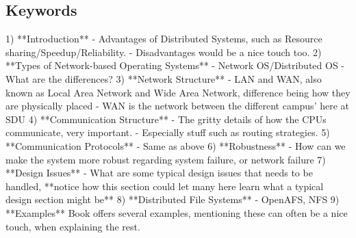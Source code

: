 \documentclass[a4paper,10pt,titlepage]{report}
\begin{document}
\subsection{Keywords}
1) **Introduction** 
	- Advantages of Distributed Systems, such as Resource sharing/Speedup/Reliability. 
	- Disadvantages would be a nice touch too.
2) **Types of Network-based Operating Systems** 
	- Network OS/Distributed OS
	- What are the differences?
3) **Network Structure** 
	- LAN and WAN, also known as Local Area Network and Wide Area Network, difference being how they are physically placed 
	- WAN is the network between the different campus' here at SDU
4) **Communication Structure** 
	- The gritty details of how the CPUs communicate, very important. 
	- Especially stuff such as routing strategies.
5) **Communication Protocols** 
	- Same as above
6) **Robustness** 
	- How can we make the system more robust regarding system failure, or network failure
7) **Design Issues** 
	- What are some typical design issues that needs to be handled, 
	**notice how this section could let many here learn what a typical design section might be**
8) **Distributed File Systems** 
	- OpenAFS, NFS
9) **Examples** 
	Book offers several examples, mentioning these can often be a nice touch, when explaining the rest.
	
\end{document}
